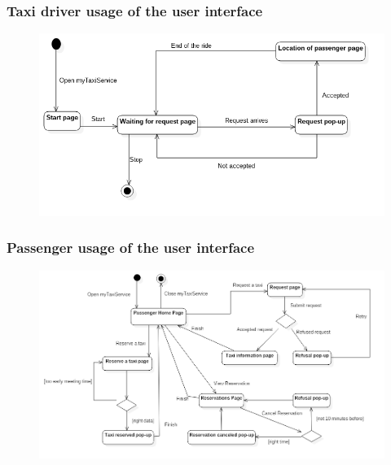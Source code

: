 \subsubsection{Taxi driver usage of the user interface}
\begin{figure}[H]
\centering
\includegraphics[scale=0.5]{Images/statechart_GUI}
\end{figure}

\subsubsection{Passenger usage of the user interface}
\begin{figure}[H]
\centering
\includegraphics[scale=0.5]{Images/statechart_GUI_Passenger}
\end{figure}